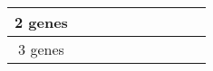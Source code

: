 \documentclass[10pt]{article}
\begin{document}
\begin{table}[ht]
\begin{tabular}{|c|c|c|c|c|c|c|c|c|c|}
2 genes           &                                                        &                                                        &                                                        &                                                        &                                                       &                                                       &                                                        &                                                       &                                                       \\ \hline
3 genes           &                                                        &                                                        &                                                        &                                                        &                                                       &                                                       &                                                        &                                                       &                                                       \\ \hline
\end{tabular}
\end{table}
\end{document}
